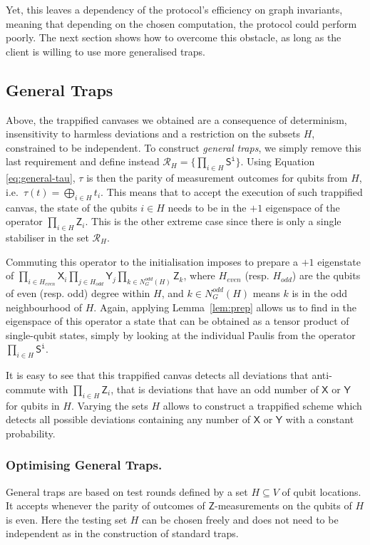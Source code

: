 \documentclass[12pt]{iopart}
\newcommand{\cptp}[1]{\mathsf{#1}} \newcommand{\pd}[1]{\mathcal{#1}}  \newcommand{\sch}[1]{\bm{#1}}
\newcommand{\X}{\cptp{X}}
\newcommand{\Z}{\cptp{Z}}
\newcommand{\Y}{\cptp{Y}}
\renewcommand{\1}{\mathds{1}}
\begin{document}
Yet, this leaves a dependency of the protocol's efficiency on graph invariants, meaning that depending on the chosen computation, the protocol could perform poorly.
The next section shows how to overcome this obstacle, as long as the client is willing to use more generalised traps.

\subsection{General Traps}
\label{subsec:gen-trap}

Above, the trappified canvases we obtained are a consequence of determinism,
insensitivity to harmless deviations and a restriction on the subsets $H$,
constrained to be independent. To
construct \emph{general traps}, we simply remove this last requirement and 
define instead $\mathcal{R}_H = \{\prod_{i \in H} \cptp S^{\mathtt{i}}\}$.
Using Equation \ref{eq:general-tau}, $\tau$ is then the parity of measurement outcomes
for qubits from $H$, i.e.~$\tau(t) = \bigoplus_{i\in H}
t_i$. This means that to accept the execution of such trappified canvas, the state of
the qubits $i \in H$ needs to be in the $+1$ eigenspace of the operator
$\prod_{i \in H} \Z_i$. This is the other extreme case since there is only a 
single stabiliser in the set $\mathcal{R}_H$.

Commuting this operator to the
initialisation imposes to prepare a $+1$ eigenstate of
$\prod_{i \in H_{even}}\X_i \prod_{j\in
H_{odd}} \Y_j \prod_{k \in N_G^{odd}(H)} \Z_k$, where $H_{even}$
(resp. $H_{odd}$) are the qubits of even (resp. odd) degree within
$H$, and $k \in N_G^{odd}(H)$ means $k$ is in the odd neighbourhood of
$H$. Again, applying Lemma~\ref{lem:prep} allows us to find in the
eigenspace of this operator a state that can be obtained as a tensor
product of single-qubit states, simply by looking at the individual
Paulis from the operator $\prod_{i \in H} \cptp S^{\mathtt{i}}$.

It is easy to see that this trappified canvas detects all deviations that
anti-commute with $\prod_{i \in H} \Z_i$, that is deviations that
have an odd number of $\X$ or $\Y$ for qubits in $H$.
Varying the sets $H$ allows to construct a trappified scheme which
detects all possible deviations containing any number of $\X$ or $\Y$ with a constant probability.

\subsubsection{Optimising General Traps.}
General traps are based on test rounds defined by a set $H \subseteq V$ of qubit locations.
It accepts whenever the parity of outcomes of $\Z$-measurements on the qubits of $H$ is even.
Here the testing set $H$ can be chosen freely and does not need to be independent as in the construction of standard traps.
\end{document}
